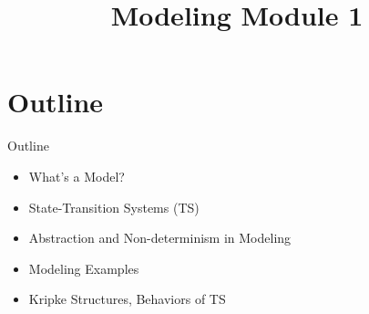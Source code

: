 \documentclass{beamer}
\title{Modeling Module 1}
\begin{document}
\begin{frame}
  \titlepage
\end{frame}


\section{Outline}


\begin{frame}{Outline}
\begin{itemize}
\item What's a Model?

\item State-Transition Systems (TS)

\item Abstraction and Non-determinism in Modeling

\item Modeling Examples

\item Kripke Structures, Behaviors of TS
\end{itemize}
\end{frame}
\end{document}
